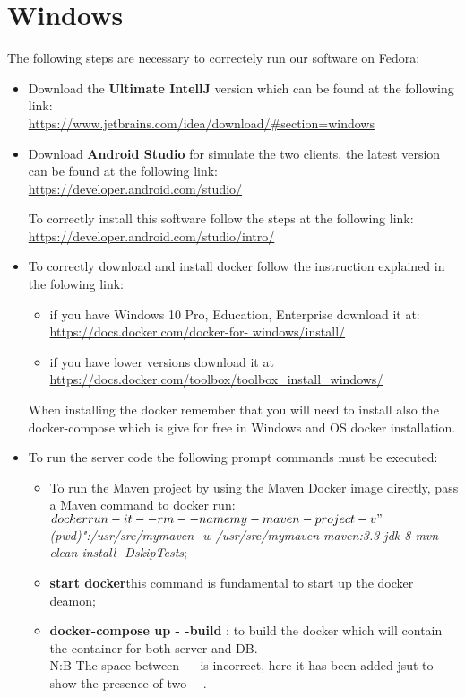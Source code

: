 \section{Windows}
The following steps are necessary to correctely run our software on Fedora:
\begin{itemize}
	\item Download the \textbf{Ultimate IntellJ} version which can be found at the following link:\\
 		\url{https://www.jetbrains.com/idea/download/#section=windows}

	\item Download \textbf{Android Studio} for simulate the two clients, the latest version can be found at the following link:\\
		\url{https://developer.android.com/studio/}

		To correctly install this software follow the steps at the following link:\\
		\url{https://developer.android.com/studio/intro/}

	\item To correctly download and install docker follow the instruction explained in the folowing link:\\
		\begin{itemize}
		\item if you have Windows 10 Pro, Education, Enterprise download it at: \url{https://docs.docker.com/docker-for-					windows/install/}\\
		\item if you have lower versions download it at \url{https://docs.docker.com/toolbox/toolbox_install_windows/}
		\end{itemize}
	When installing the docker remember that you will need to install also the docker-compose which is give for free in Windows 			and OS docker installation.

	\item To run the server code the following prompt commands must be executed:\\
		\begin{itemize}
			\item To run the  Maven project by using the Maven Docker image directly, pass a Maven command to docker 					run:\\
\textit{$ docker run -it --rm --name my-maven-project -v "$(pwd)":/usr/src/mymaven -w /usr/src/mymaven maven:3.3-jdk-8 mvn clean install -DskipTests};
			\item \textbf{start docker}this command is fundamental to start up the docker deamon;	
			\item \textbf{ docker-compose up - -build} : to build the docker which will contain the container for both server 					and DB.\\N:B The space between - - is incorrect, here it has been added jsut to show the presence of two - -.
		\end{itemize}


\end{itemize}
